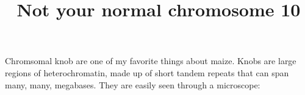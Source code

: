 \documentclass[]{article}
\begin{document}
\title{Not your normal chromosome 10}
\maketitle

Chromsomal knob are one of my favorite things about maize. Knobs are large regions of heterochromatin, made up of short tandem repeats that can span many, many, megabases.  They are easily seen through a microscope:


\end{document}
